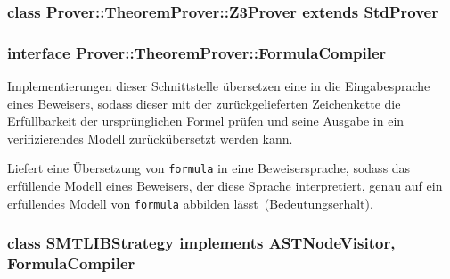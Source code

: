 \subsubsection{class Prover::TheoremProver::Z3Prover extends StdProver}%


\begin{description}%


\end{description}%

\subsubsection{interface Prover::TheoremProver::FormulaCompiler}%

Implementierungen dieser Schnittstelle übersetzen eine
 in die Eingabesprache eines Beweisers, sodass dieser
mit der zurückgelieferten Zeichenkette die Erfüllbarkeit der
ursprünglichen Formel prüfen und seine Ausgabe in ein verifizierendes
Modell zurückübersetzt werden kann.%


\begin{description}%

    Liefert eine Übersetzung von \texttt{formula} in eine
    Beweisersprache, sodass das erfüllende Modell eines Beweisers, der
    diese Sprache interpretiert, genau auf ein erfüllendes Modell von
    \texttt{formula} abbilden lässt~(Bedeutungserhalt).%


\end{description}%

\subsubsection{class SMTLIBStrategy implements ASTNodeVisitor, FormulaCompiler}%


\begin{description}%

\end{description}%


